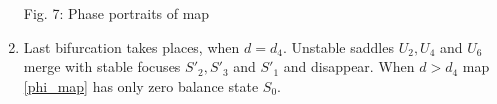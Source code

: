 \documentclass[12pt]{amsart}
\begin{document}
\begin{enumerate}
\hspace{-1.0cm}
\begin{minipage}[h]{0.65\linewidth}
\end{minipage}
\hspace{-3.0cm}
\begin{minipage}[h]{0.65\linewidth}
\end{minipage}
\begin{center}
	Fig. 7: Phase portraits of map
\end{center}
\item Last bifurcation takes places, when $ d = d_4 $. Unstable saddles $ U_2, U_4 $ and $ U_6 $ merge with stable focuses $ S'_2, S'_3 $ and $ S'_1 $ and disappear. When $ d > d_4 $ map \eqref{phi_map} has only zero balance state $ S_0 $.

\end{enumerate}
\end{document}
